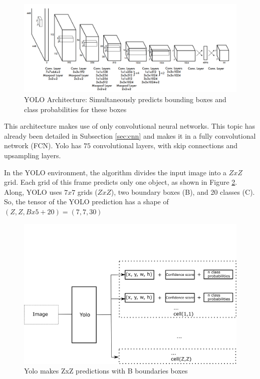 \begin{figure}[H]
\centering
\includegraphics[width=\textwidth]{imagens/yolo.png}
\caption{YOLO Architecture: Simultaneously predicts bounding boxes and class probabilities for these boxes \cite{redmon2016you}}
\label{fig:yolo_arc}
\end{figure}

This architecture makes use of only convolutional neural networks. This topic has already been detailed in Subsection \ref{sec:cnn} and makes it in a fully convolutional network (FCN). Yolo has $75$ convolutional layers, with skip connections and upsampling layers.  





In the YOLO environment, the algorithm divides the input image into a $ZxZ$ grid. Each grid of this frame predicts only one object, as shown in Figure \ref{fig:yolo_flow}. Along, YOLO uses $7x7$ grids ($ZxZ$), two boundary boxes (B), and 20 classes (C). So, the tensor of the YOLO prediction has a shape of $(Z, Z, Bx5+20) = (7,7,30)$


\begin{figure}[H]
\centering
\includegraphics[width=\textwidth]{imagens/yolo_flow.png}
\caption{Yolo makes ZxZ predictions with B boundaries boxes}
\label{fig:yolo_flow}
\end{figure}

